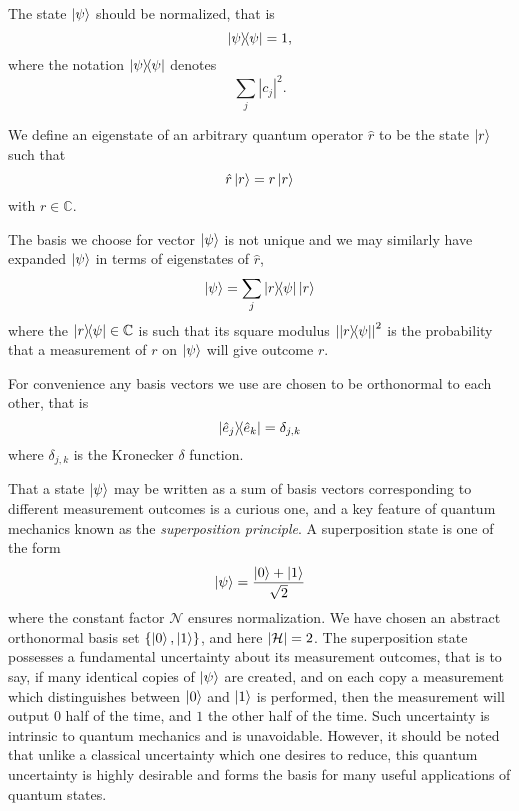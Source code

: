 The state $\ket{\psi}$ should be normalized, that is
\begin{equation}
\dyad{\psi} = 1,
\end{equation}
where the notation $\dyad{\psi}$ denotes 
\begin{equation}
\sum_j \left|c_j\right|^2.
\end{equation}

\noindent We define an eigenstate of an arbitrary quantum operator $\hat{r}$ to be the state $\ket{r}$ such that
\begin{equation}
\hat{r} \ket{r} = r \ket{r}
\end{equation}
with $r \in \mathbb{C}$.

The basis we choose for vector $\ket{\psi}$ is not unique and we may similarly have expanded $\ket{\psi}$ in terms of eigenstates of $\hat{r}$,
\begin{equation}
\ket{\psi} = \sum_j \dyad{r}{\psi} \ket{r}
\end{equation}
where the $\dyad{r}{\psi} \in \mathbb{C}$ is such that its square modulus $\left|\dyad{r}{\psi}\right|^2$ is the probability that a measurement of $r$ on $\ket{\psi}$ will give outcome $r$.

For convenience any basis vectors we use are chosen to be orthonormal to each other, that is
\begin{equation}
\dyad{\hat{e}_j}{\hat{e}_k} = \delta_{j, k}
\end{equation}
where $\delta_{j, k}$ is the Kronecker $\delta$ function.

That a state $\ket{\psi}$ may be written as a sum of basis vectors corresponding to different measurement outcomes is a curious one, and a key feature of quantum mechanics known as the \emph{superposition principle}. A superposition state is one of the form
\begin{equation}\label{eqn:intro_superposition}
\ket{\psi} = \frac{\ket{0} + \ket{1}}{\sqrt{2}}
\end{equation}
where the constant factor $\mathcal{N}$ ensures normalization. We have chosen an abstract orthonormal basis set $\left\{ \ket{0}, \ket{1}\right\}$, and here $\left|\mathcal{H}\right|=2$. The superposition state possesses a fundamental uncertainty about its measurement outcomes, that is to say, if many identical copies of $\ket{\psi}$ are created, and on each copy a measurement which distinguishes between $\ket{0}$ and $\ket{1}$ is performed, then the measurement will output $0$ half of the time, and $1$ the other half of the time. Such uncertainty is intrinsic to quantum mechanics and is unavoidable. However, it should be noted that unlike a classical uncertainty which one desires to reduce, this quantum uncertainty is highly desirable and forms the basis for many useful applications of quantum states.


